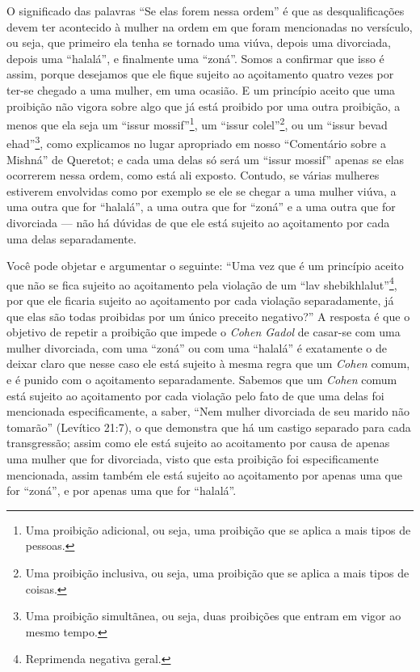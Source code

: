 O significado das palavras ``Se elas forem nessa ordem'' é que as
desqualificações devem ter acontecido à mulher na ordem em que foram
mencionadas no versículo, ou seja, que primeiro ela tenha se tornado uma
viúva, depois uma divorciada, depois uma ``halalá'', e finalmente uma
``zoná''. Somos a confirmar que isso é assim, porque desejamos que ele
fique sujeito ao açoitamento quatro vezes por ter-se chegado a uma
mulher, em uma ocasião. E um princípio aceito que uma proibição não
vigora sobre algo que já está proibido por uma outra proibição, a menos
que ela seja um ``issur mossif''\footnote{Uma proibição adicional, ou seja, uma proibição que se aplica a
mais tipos de pessoas.}, um ``issur
colel''\footnote{Uma proibição inclusiva, ou seja, uma proibição que se aplica a
mais tipos de coisas.}, ou um ``issur bevad
ehad''\footnote{Uma proibição simultãnea, ou seja, duas proibições que entram em
  vigor ao mesmo tempo.}, como explicamos no lugar apropriado em
nosso ``Comentário sobre a Mishná'' de Queretot; e cada uma delas só
será um ``issur mossif'' apenas se elas ocorrerem nessa ordem, como está
ali exposto. Contudo, se várias mulheres estiverem envolvidas como por
exemplo se ele se chegar a uma mulher viúva, a uma outra que for
``halalá'', a uma outra que for ``zoná'' e a uma outra que for
divorciada --- não há dúvidas de que ele está sujeito ao açoitamento por
cada uma delas separadamente.

Você pode objetar e argumentar o seguinte: ``Uma vez que é um princípio
aceito que não se fica sujeito ao açoitamento pela violação de um ``lav
shebikhlalut''\footnote{Reprimenda negativa geral.}, por que ele ficaria sujeito ao
açoitamento por cada violação separadamente, já que elas são todas
proibidas por um único preceito negativo?'' A resposta é que o objetivo
de repetir a proibição que impede o \textit{Cohen Gadol} de casar-se com uma
mulher divorciada, com uma ``zoná'' ou com uma ``halalá'' é exatamente o
de deixar claro que nesse caso ele está sujeito à mesma regra que um
\textit{Cohen} comum, e é punido com o açoitamento separadamente. Sabemos
que um \textit{Cohen} comum está sujeito ao açoitamento por cada violação
pelo fato de que uma delas foi mencionada especificamente, a saber,
``Nem mulher divorciada de seu marido não tomarão'' (Levítico 21:7), o
que demonstra que há um castigo separado para cada transgressão; assim
como ele está sujeito ao acoitamento por causa de apenas uma mulher que
for divorciada, visto que esta proibição foi especificamente mencionada,
assim também ele está sujeito ao açoitamento por apenas uma que for
``zoná'', e por apenas uma que for ``halalá''.


